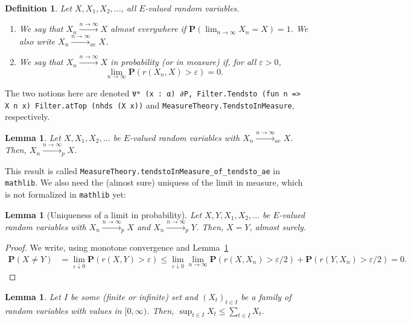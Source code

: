 \documentclass{article}
\newtheorem{lemma}[proposition]{Lemma}
\newtheorem{definition}[proposition]{Definition}
\theoremstyle{definition}
\theoremstyle{step} \newtheorem{step}{Step}
\newcommand{\leanline}[1]{\texttt{#1}}%
\begin{document}
\begin{definition}
  Let $X,X_1,X_2,...$, all $E$-valued random variables.
  \begin{enumerate}
  \item We say that $X_n \xrightarrow{n\to\infty} X$ almost everywhere
    if $\mathbf P(\lim_{n\to\infty} X_n = X) = 1$. We also write
    $X_n\xrightarrow{n\to\infty}_{ae} X$.
  \item We say that $X_n \xrightarrow{n\to\infty} X$ in probability
    (or in measure) if, for all $\varepsilon>0$,
    $$ \lim_{n\to\infty} \mathbf P(r(X_n, X) > \varepsilon) = 0.$$
  \end{enumerate}
\end{definition}
The two notions here are denoted \leanline{∀ᵐ (x : α) ∂P,
  Filter.Tendsto (fun n => X n x) Filter.atTop (nhds (X x))} and
\leanline{MeasureTheory.TendstoInMeasure}, respectively.

\begin{lemma}\label{l:aep}
  Let $X,X_1,X_2,...$ be $E$-valued random variables with $X_n
  \xrightarrow{n\to\infty}_{ae} X$. Then, $X_n
  \xrightarrow{n\to\infty}_{p} X$.
\end{lemma}

This result is called
\leanline{MeasureTheory.tendstoInMeasure_of_tendsto_ae} in
\leanline{mathlib}. We also need the (almost sure) uniquess of the
limit in measure, which is not formalized in \leanline{mathlib} yet:

\begin{lemma}[Uniqueness of a limit in probability]\label{l:puni}
  Let $X,Y,X_1,X_2,...$ be $E$-valued random variables with $X_n
  \xrightarrow{n\to\infty}_{p} X$ and $X_n
  \xrightarrow{n\to\infty}_{p} Y$. Then, $X=Y$, almost surely.
\end{lemma}

\begin{proof}
  We write, using monotone convergence and Lemma~\ref{l:aep}
  \begin{align*}
    \mathbf P(X\neq Y) & = \lim_{\varepsilon \downarrow 0} \mathbf
    P(r(X,Y)>\varepsilon) \leq \lim_{\varepsilon \downarrow 0}
    \lim_{n\to\infty}\mathbf P(r(X,X_n)>\varepsilon/2) + \mathbf
    P(r(Y,X_n)>\varepsilon/2) = 0.
  \end{align*}
\end{proof}

\begin{lemma}\label{l:supsum}
  Let $I$ be some (finite or infinite) set and $(X_t)_{t\in I}$ be a
  family of random variables with values in $[0,\infty)$. Then,
    $\sup_{t\in I} X_t \leq \sum_{t\in I} X_t.$
\end{lemma}
\end{document}
